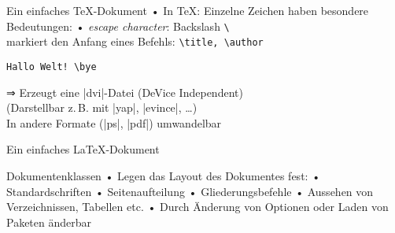 \begin{frame}[fragile]{Ein einfaches \TeX-Dokument}
• In \TeX: Einzelne Zeichen haben besondere Bedeutungen:
• \emph{escape character}: Backslash \verb|\|\\
markiert den Anfang eines Befehls: \verb|\title, \author|%
\• 
\begin{lstlisting}
Hallo Welt! \bye
\end{lstlisting}

\pause\vspace{1cm}
⇒ Erzeugt eine |dvi|-Datei (DeVice Independent)\\
(Darstellbar z.\,B. mit |yap|, |evince|, …)\\
In andere Formate (|ps|, |pdf|) umwandelbar
\end{frame}


\begin{frame}[fragile]{Ein einfaches \LaTeX-Dokument} 
\end{frame}

\begin{frame}{Dokumentenklassen}
• Legen das Layout des Dokumentes fest:
• Standardschriften
• Seitenaufteilung
• Gliederungsbefehle
• Aussehen von Verzeichnissen, Tabellen etc.
• Durch Änderung von Optionen oder Laden von Paketen änderbar
\•
\end{frame}

